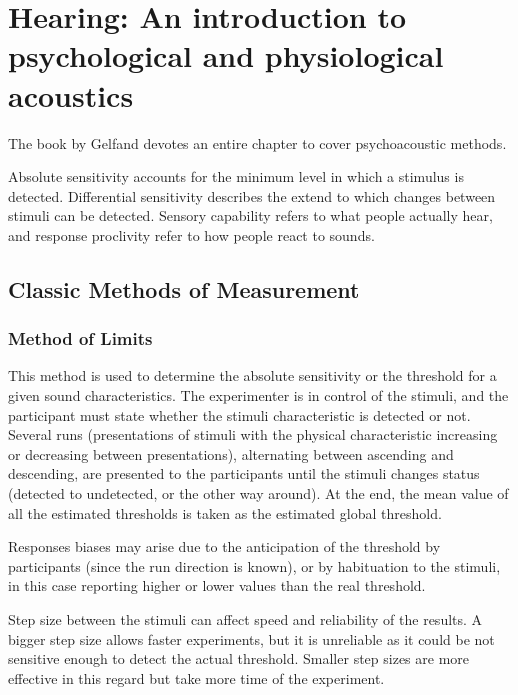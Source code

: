 \section{Hearing: An introduction to psychological and physiological acoustics}

The book by Gelfand \cite{gelfand2009hearing} devotes an entire chapter to cover
psychoacoustic methods.

Absolute sensitivity accounts for the minimum level in which a stimulus is
detected. Differential sensitivity describes the extend to which changes between
stimuli can be detected. Sensory capability refers to what people actually hear,
and response proclivity refer to how people react to sounds.

\subsection{Classic Methods of Measurement}

\subsubsection{Method of Limits}

This method is used to determine the absolute sensitivity or the threshold for a
given sound characteristics. The experimenter is in control of the stimuli, and
the participant must state whether the stimuli characteristic is detected or
not. Several runs (presentations of stimuli with the physical characteristic
increasing or decreasing between presentations), alternating between ascending
and descending, are presented to the participants until the stimuli changes
status (detected to undetected, or the other way around). At the end, the mean
value of all the estimated thresholds is taken as the estimated global
threshold.

Responses biases may arise due to the anticipation of the threshold by
participants (since the run direction is known), or by habituation to the
stimuli, in this case reporting higher or lower values than the real threshold.

Step size between the stimuli can affect speed and reliability of the results.
A bigger step size allows faster experiments, but it is unreliable as it could
be not sensitive enough to detect the actual threshold. Smaller step sizes are
more effective in this regard but take more time of the experiment.

